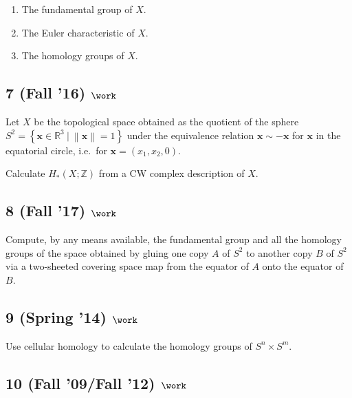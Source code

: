 \begin{enumerate}
\def\labelenumi{\alph{enumi}.}
\item
  The fundamental group of \(X\).
\item
  The Euler characteristic of \(X\).
\item
  The homology groups of \(X\).
\end{enumerate}

\hypertarget{fall-16-work-4}{%
\subsection{\texorpdfstring{7 (Fall '16)
\(\work\)}{7 (Fall '16) \textbackslash work}}\label{fall-16-work-4}}

Let \(X\) be the topological space obtained as the quotient of the
sphere
\(S^2 = \left\{{\mathbf{x} \in {\mathbb{R}}^3 {~\mathrel{\Big|}~}{\left\lVert {\mathbf{x}} \right\rVert} = 1}\right\}\)
under the equivalence relation \(\mathbf{x} \sim -\mathbf{x}\) for
\(\mathbf{x}\) in the equatorial circle, i.e.~for
\(\mathbf{x} = (x_1, x_2, 0)\).

Calculate \(H_* (X; {\mathbb{Z}})\) from a CW complex description of
\(X\).

\hypertarget{fall-17-work-2}{%
\subsection{\texorpdfstring{8 (Fall '17)
\(\work\)}{8 (Fall '17) \textbackslash work}}\label{fall-17-work-2}}

Compute, by any means available, the fundamental group and all the
homology groups of the space obtained by gluing one copy \(A\) of
\(S^2\) to another copy \(B\) of \(S^2\) via a two-sheeted covering
space map from the equator of \(A\) onto the equator of \(B\).

\hypertarget{spring-14-work-1}{%
\subsection{\texorpdfstring{9 (Spring '14)
\(\work\)}{9 (Spring '14) \textbackslash work}}\label{spring-14-work-1}}

Use cellular homology to calculate the homology groups of
\(S^n \times S^m\).

\hypertarget{fall-09fall-12-work}{%
\subsection{\texorpdfstring{10 (Fall '09/Fall '12)
\(\work\)}{10 (Fall '09/Fall '12) \textbackslash work}}\label{fall-09fall-12-work}}

